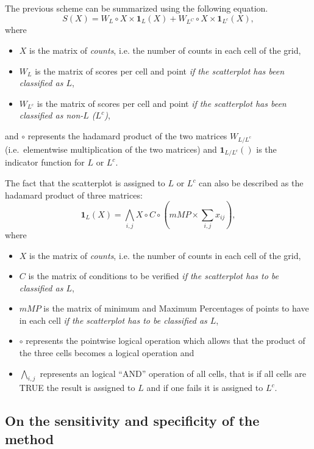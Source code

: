 \documentclass[10pt,letterpaper]{article}
\begin{document}
The previous scheme can be summarized using the following equation.
\begin{equation}
S(X) = W_L \circ X \times \mathbf{1}_L(X) + W_{L^C} \circ X \times \mathbf{1}_{L^c}(X),
\end{equation} where

\begin{itemize}
\item ${X}$ is the matrix of \emph{counts}, i.e. the number of counts in each cell of the grid,
\item ${W_L}$ is the matrix of scores per cell and point \emph{if the scatterplot has been classified as $L$},
\item ${W_{L^c}}$ is the matrix of scores per cell and point \emph{if the scatterplot has been classified as non-$L$ ($L^c$)},
\end{itemize}

and \(\circ\) represents the hadamard product of the two matrices
\(W_{L/L^c}\) (i.e.~elementwise multiplication of the two matrices) and
\(\mathbf{1}_{L/L^c}()\) is the indicator function for \(L\) or \(L^c\).

The fact that the scatterplot is assigned to \(L\) or \(L^c\) can also
be described as the hadamard product of three matrices: \begin{equation}
\mathbf{1}_L(X) = \bigwedge_{i,j} X \circ C \circ \left( mMP \times \sum_{i,j}x_{ij}\right),
\end{equation} where

\begin{itemize}
\item ${X}$ is the matrix of \emph{counts}, i.e. the number of counts in each cell of the grid,
\item $C$ is the matrix of conditions to be verified \emph{if the scatterplot has to be classified as $L$},
\item $mMP$ is the matrix of minimum and Maximum Percentages of points to have in each cell \emph{if the scatterplot has to be classified as $L$},
\item $\circ$ represents the pointwise logical operation which allows that the product of the three cells becomes a logical operation and
\item $\bigwedge_{i,j}$ represents an logical ``AND'' operation of all cells, that is if all cells are TRUE the result is assigned to $L$ and if one fails it is assigned to $L^c$.
\end{itemize}

\hypertarget{on-the-sensitivity-and-specificity-of-the-method}{%
\subsection{On the sensitivity and specificity of the
method}\label{on-the-sensitivity-and-specificity-of-the-method}}
\end{document}
